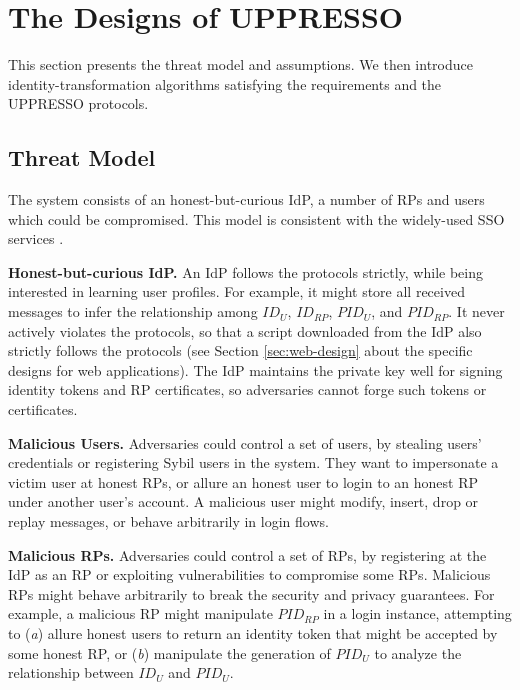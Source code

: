 
\section{The Designs of UPPRESSO}
\label{sec:UPPRESSO}

This section presents the threat model and assumptions.
We then introduce identity-transformation algorithms satisfying the requirements
    and the UPPRESSO protocols.


\subsection{Threat Model}
The system consists of an honest-but-curious IdP, a number of RPs and users which could be compromised. %
This model is consistent with the widely-used SSO services \cite{OpenIDConnect,rfc6749,SAML,SAMLIdentifier,NIST2017draft}.

\noindent \textbf{Honest-but-curious IdP.}
An IdP follows the protocols strictly, while being interested in learning user profiles.
For example, it might store all received messages
 to infer the relationship among $ID_U$, $ID_{RP}$, $PID_{U}$, and $PID_{RP}$.
It never actively violates the protocols,
so that a script downloaded from the IdP also strictly follows the protocols (see Section \ref{sec:web-design} about the specific designs
    for web applications).
The IdP maintains the private key well for signing identity tokens and RP certificates, %
so adversaries cannot forge such tokens or certificates.

\noindent \textbf{Malicious Users.}
Adversaries could control a set of users,
 by stealing users' credentials or registering Sybil users in the system.
They want to impersonate a victim user at honest RPs,
 or allure an honest user to login to an honest RP under another user's account.
A malicious user might
    modify, insert, drop or replay messages, or behave arbitrarily in login flows.

\noindent \textbf{Malicious RPs.}
Adversaries could control a set of RPs, by registering at the IdP as an RP
     or exploiting vulnerabilities to compromise some RPs.
Malicious RPs might behave arbitrarily to break the security and privacy guarantees.
For example,
a malicious RP might manipulate $PID_{RP}$ in a login instance,
    attempting to (\emph{a}) allure honest users to return an identity token that might be accepted by some honest RP,
or (\emph{b}) manipulate the generation of $PID_U$ to
    analyze the relationship between $ID_U$ and $PID_U$.


